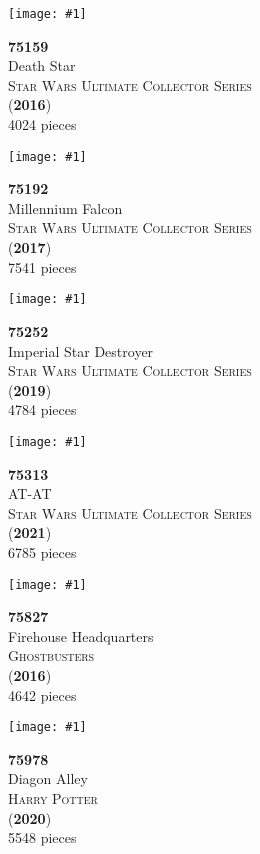 \documentclass[letterpaper]{article}%
\newenvironment{legocell}[1]
{
	\begin{minipage}[c][2.0in][c]{4in}
	\centering
	\varwidth{3.6in}
	\raggedright %
	\begin{minipage}[c]{1.3in}
		\texttt{[image: \#1]}
	\end{minipage}
	\begin{minipage}[c]{2.2in}
	\raggedright
}
{
	\end{minipage}
	\endvarwidth
	\end{minipage}
	\allowbreak
	\ignorespaces
}
\begin{document}
\begin{legocell}{images/set_75159-1.jpg}
\textbf{75159}\\
{\sffamily\large Death Star}\\
\textsc{\color{DarkBlue}\normalsize Star Wars Ultimate Collector Series}\\
(\textbf{2016})\\
{\normalsize 4024 pieces}\\
\end{legocell}
\begin{legocell}{images/set_75192-1.jpg}
\textbf{75192}\\
{\sffamily\large Millennium Falcon}\\
\textsc{\color{DarkBlue}\normalsize Star Wars Ultimate Collector Series}\\
(\textbf{2017})\\
{\normalsize 7541 pieces}\\
\end{legocell}
\begin{legocell}{images/set_75252-1.jpg}
\textbf{75252}\\
{\sffamily\large Imperial Star Destroyer}\\
\textsc{\color{DarkBlue}\normalsize Star Wars Ultimate Collector Series}\\
(\textbf{2019})\\
{\normalsize 4784 pieces}\\
\end{legocell}
\begin{legocell}{images/set_75313-1.jpg}
\textbf{75313}\\
{\sffamily\large AT-AT}\\
\textsc{\color{DarkBlue}\normalsize Star Wars Ultimate Collector Series}\\
(\textbf{2021})\\
{\normalsize 6785 pieces}\\
\end{legocell}
\begin{legocell}{images/set_75827-1.jpg}
\textbf{75827}\\
{\sffamily\large Firehouse Headquarters}\\
\textsc{\color{DarkBlue}\normalsize Ghostbusters}\\
(\textbf{2016})\\
{\normalsize 4642 pieces}\\
\end{legocell}
\begin{legocell}{images/set_75978-1.jpg}
\textbf{75978}\\
{\sffamily\large Diagon Alley}\\
\textsc{\color{DarkBlue}\normalsize Harry Potter}\\
(\textbf{2020})\\
{\normalsize 5548 pieces}\\
\end{legocell}
\end{document}
